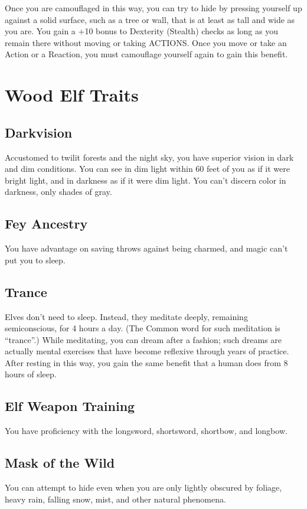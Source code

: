 \documentclass[letterpaper,openany,oneside,twocolumn]{book}
\begin{document}
Once you are camouflaged in this way, you can try to hide by pressing yourself up against a solid surface, such as a tree or wall, that is at least as tall and wide as you are. You gain a +10 bonus to Dexterity (Stealth) checks as long as you remain there without moving or taking ACTIONS. Once you move or take an Action or a Reaction, you must camouflage yourself again to gain this benefit.

\section*{Wood Elf Traits}
\subsection*{Darkvision}
Accustomed to twilit forests and the night sky, you have superior vision in dark and dim conditions. You can see in dim light within 60 feet of you as if it were bright light, and in darkness as if it were dim light. You can't discern color in darkness, only shades of gray.

\subsection*{Fey Ancestry}
You have advantage on saving throws against being charmed, and magic can't put you to sleep.

\subsection*{Trance}
Elves don't need to sleep. Instead, they meditate deeply, remaining semiconscious, for 4 hours a day. (The Common word for such meditation is “trance”.) While meditating, you can dream after a fashion; such dreams are actually mental exercises that have become reflexive through years of practice. After resting in this way, you gain the same benefit that a human does from 8 hours of sleep.

\subsection*{Elf Weapon Training}
You have proficiency with the longsword, shortsword, shortbow, and longbow.

\subsection*{Mask of the Wild}
You can attempt to hide even when you are only lightly obscured by foliage, heavy rain, falling snow, mist, and other natural phenomena.
\end{document}
